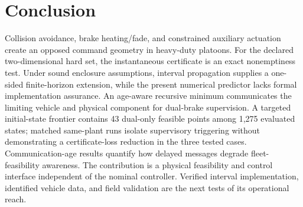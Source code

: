\section{Conclusion}
Collision avoidance, brake heating/fade, and constrained auxiliary actuation create an opposed command geometry in heavy-duty platoons. For the declared two-dimensional hard set, the instantaneous certificate is an exact nonemptiness test. Under sound enclosure assumptions, interval propagation supplies a one-sided finite-horizon extension, while the present numerical predictor lacks formal implementation assurance. An age-aware recursive minimum communicates the limiting vehicle and physical component for dual-brake supervision. A targeted initial-state frontier contains 43 dual-only feasible points among 1,275 evaluated states; matched same-plant runs isolate supervisory triggering without demonstrating a certificate-loss reduction in the three tested cases. Communication-age results quantify how delayed messages degrade fleet-feasibility awareness. The contribution is a physical feasibility and control interface independent of the nominal controller. Verified interval implementation, identified vehicle data, and field validation are the next tests of its operational reach.
